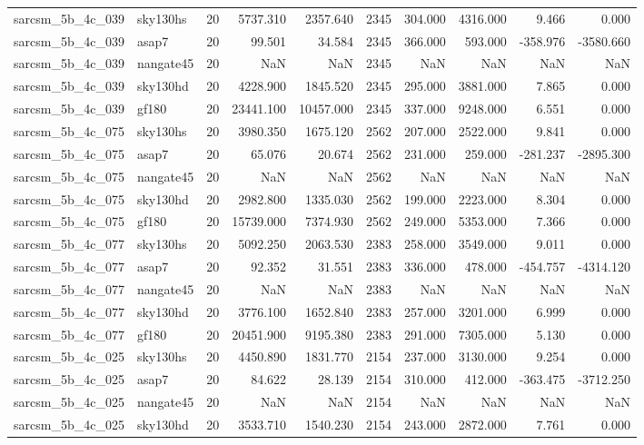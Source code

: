 \begin{longtable}{llrrrrrrrr}
sarcsm\_5b\_4c\_039 & sky130hs & 20 & 5737.310 & 2357.640 & 2345 & 304.000 & 4316.000 & 9.466 & 0.000 \\
sarcsm\_5b\_4c\_039 & asap7 & 20 & 99.501 & 34.584 & 2345 & 366.000 & 593.000 & -358.976 & -3580.660 \\
sarcsm\_5b\_4c\_039 & nangate45 & 20 & NaN & NaN & 2345 & NaN & NaN & NaN & NaN \\
sarcsm\_5b\_4c\_039 & sky130hd & 20 & 4228.900 & 1845.520 & 2345 & 295.000 & 3881.000 & 7.865 & 0.000 \\
sarcsm\_5b\_4c\_039 & gf180 & 20 & 23441.100 & 10457.000 & 2345 & 337.000 & 9248.000 & 6.551 & 0.000 \\
sarcsm\_5b\_4c\_075 & sky130hs & 20 & 3980.350 & 1675.120 & 2562 & 207.000 & 2522.000 & 9.841 & 0.000 \\
sarcsm\_5b\_4c\_075 & asap7 & 20 & 65.076 & 20.674 & 2562 & 231.000 & 259.000 & -281.237 & -2895.300 \\
sarcsm\_5b\_4c\_075 & nangate45 & 20 & NaN & NaN & 2562 & NaN & NaN & NaN & NaN \\
sarcsm\_5b\_4c\_075 & sky130hd & 20 & 2982.800 & 1335.030 & 2562 & 199.000 & 2223.000 & 8.304 & 0.000 \\
sarcsm\_5b\_4c\_075 & gf180 & 20 & 15739.000 & 7374.930 & 2562 & 249.000 & 5353.000 & 7.366 & 0.000 \\
sarcsm\_5b\_4c\_077 & sky130hs & 20 & 5092.250 & 2063.530 & 2383 & 258.000 & 3549.000 & 9.011 & 0.000 \\
sarcsm\_5b\_4c\_077 & asap7 & 20 & 92.352 & 31.551 & 2383 & 336.000 & 478.000 & -454.757 & -4314.120 \\
sarcsm\_5b\_4c\_077 & nangate45 & 20 & NaN & NaN & 2383 & NaN & NaN & NaN & NaN \\
sarcsm\_5b\_4c\_077 & sky130hd & 20 & 3776.100 & 1652.840 & 2383 & 257.000 & 3201.000 & 6.999 & 0.000 \\
sarcsm\_5b\_4c\_077 & gf180 & 20 & 20451.900 & 9195.380 & 2383 & 291.000 & 7305.000 & 5.130 & 0.000 \\
sarcsm\_5b\_4c\_025 & sky130hs & 20 & 4450.890 & 1831.770 & 2154 & 237.000 & 3130.000 & 9.254 & 0.000 \\
sarcsm\_5b\_4c\_025 & asap7 & 20 & 84.622 & 28.139 & 2154 & 310.000 & 412.000 & -363.475 & -3712.250 \\
sarcsm\_5b\_4c\_025 & nangate45 & 20 & NaN & NaN & 2154 & NaN & NaN & NaN & NaN \\
sarcsm\_5b\_4c\_025 & sky130hd & 20 & 3533.710 & 1540.230 & 2154 & 243.000 & 2872.000 & 7.761 & 0.000 \\

\end{longtable}
